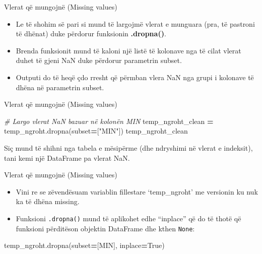 \documentclass[
  ignorenonframetext,
]{beamer}
\newenvironment{Shaded}{\begin{snugshade}}{\end{snugshade}}
\newcommand{\CommentTok}[1]{\textcolor[rgb]{0.56,0.35,0.01}{\textit{#1}}}
\newcommand{\NormalTok}[1]{#1}
\newcommand{\OperatorTok}[1]{\textcolor[rgb]{0.81,0.36,0.00}{\textbf{#1}}}
\newcommand{\StringTok}[1]{\textcolor[rgb]{0.31,0.60,0.02}{#1}}
\newcommand{\VariableTok}[1]{\textcolor[rgb]{0.00,0.00,0.00}{#1}}
\begin{document}
\begin{frame}{Vlerat që mungojnë (Missing values)}
\protect\hypertarget{vlerat-quxeb-mungojnuxeb-missing-values-3}{}
\begin{itemize}
\item
  Le të shohim së pari si mund të largojmë vlerat e munguara (pra, të
  pastroni të dhënat) duke përdorur funksionin \textbf{.dropna()}.
\item
  Brenda funksionit mund të kaloni një listë të kolonave nga të cilat
  vlerat duhet të gjeni NaN duke përdorur parametrin subset.
\item
  Outputi do të heqë çdo rresht që përmban vlera NaN nga grupi i
  kolonave të dhëna në parametrin subset.
\end{itemize}
\end{frame}

\begin{frame}[fragile]{Vlerat që mungojnë (Missing values)}
\protect\hypertarget{vlerat-quxeb-mungojnuxeb-missing-values-4}{}
\begin{Shaded}
\begin{Highlighting}[]
\CommentTok{\# Largo vlerat NaN bazuar në kolonën MIN}
\NormalTok{    temp\_ngroht\_clean }\OperatorTok{=}\NormalTok{ temp\_ngroht.dropna(subset}\OperatorTok{=}\NormalTok{[}\StringTok{"MIN"}\NormalTok{])}
\NormalTok{    temp\_ngroht\_clean}
\end{Highlighting}
\end{Shaded}

Siç mund të shihni nga tabela e mësipërme (dhe ndryshimi në vlerat e
indeksit), tani kemi një DataFrame pa vlerat NaN.
\end{frame}

\begin{frame}[fragile]{Vlerat që mungojnë (Missing values)}
\protect\hypertarget{vlerat-quxeb-mungojnuxeb-missing-values-5}{}
\begin{itemize}
\item
  Vini re se zëvendësuam variablin fillestare `temp\_ngroht' me
  versionin ku nuk ka të dhëna missing.
\item
  Funksioni \texttt{.dropna()} mund të aplikohet edhe ``inplace'' që do
  të thotë që funksioni përditëson objektin DataFrame dhe kthen
  \texttt{None}:
\end{itemize}

\begin{Shaded}
\begin{Highlighting}[]
\NormalTok{    temp\_ngroht.dropna(subset}\OperatorTok{=}\NormalTok{[}\StringTok{\textquotesingle{}MIN\textquotesingle{}}\NormalTok{], inplace}\OperatorTok{=}\VariableTok{True}\NormalTok{)}
\end{Highlighting}
\end{Shaded}
\end{frame}
\end{document}
